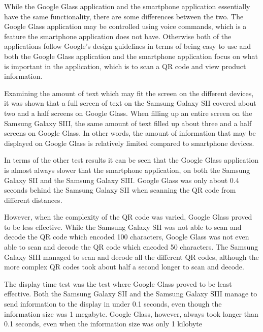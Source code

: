 While the Google Glass application and the smartphone application essentially have the same functionality, there are some differences between the two. The Google Glass application may be controlled using voice commands, which is a feature the smartphone application does not have. Otherwise both of the applications follow Google's design guidelines in terms of being easy to use and both the Google Glass application and the smartphone application focus on what is important in the application, which is to scan a QR code and view product information.

Examining the amount of text which may fit the screen on the different devices, it was shown that a full screen of text on the Samsung Galaxy SII covered about two and a half screens on Google Glass. When filling up an entire screen on the Samsung Galaxy SIII, the same amount of text filled up about three and a half screens on Google Glass. In other words, the amount of information that may be displayed on Google Glass is relatively limited compared to smartphone devices.

In terms of the other test results it can be seen that the Google Glass application is almost always slower that the smartphone application, on both the Samsung Galaxy SII and the Samsung Galaxy SIII. Google Glass was only about 0.4 seconds behind the Samsung Galaxy SII when scanning the QR code from different distances.

However, when the complexity of the QR code was varied, Google Glass proved to be less effective. While the Samsung Galaxy SII was not able to scan and decode the QR code which encoded 100 characters, Google Glass was not even able to scan and decode the QR code which encoded 50 characters. The Samsung Galaxy SIII managed to scan and decode all the different QR codes, although the more complex QR codes took about half a second longer to scan and decode.

The display time test was the test where Google Glass proved to be least effective. Both the Samsung Galaxy SII and the Samsung Galaxy SIII manage to send information to the display in under 0.1 seconds, even though the information size was 1 megabyte. Google Glass, however, always took longer than 0.1 seconds, even when the information size was only 1 kilobyte
